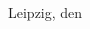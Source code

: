\begin{titlepage}
\begin{addmargin}[-1cm]{-3cm}
\begin{center}
        Leipzig, den \myTime\vfill






%
%
%

    \end{center}
  \end{addmargin}
\end{titlepage}
